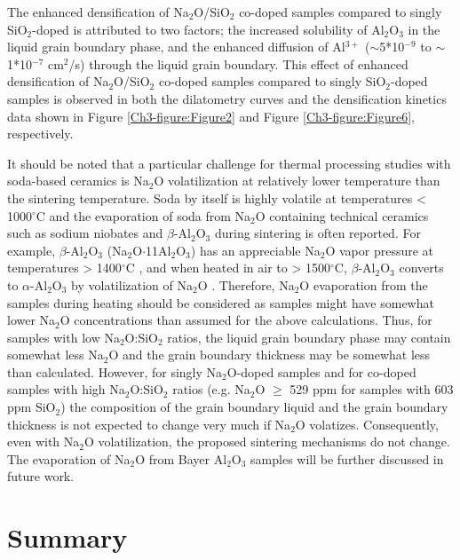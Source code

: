The enhanced densification of Na$_{2}$O/SiO$_{2}$ co-doped samples compared to singly SiO$_{2}$-doped is attributed to two factors; the increased solubility of Al$_{2}$O$_{3}$ in the liquid grain boundary phase, and the enhanced diffusion of Al$^{3+}$ ($\sim$5*10$^{-9}$ to $\sim$1*10$^{-7}$ cm$^{2}$/s) through the liquid grain boundary. This effect of enhanced densification of Na$_{2}$O/SiO$_{2}$ co-doped samples compared to singly SiO$_{2}$-doped samples is observed in both the dilatometry curves and the densification kinetics data shown in Figure \ref{Ch3-figure:Figure2} and Figure \ref{Ch3-figure:Figure6}, respectively. 

It should be noted that a particular challenge for thermal processing studies with soda-based ceramics is Na$_{2}$O volatilization at relatively lower temperature than the sintering temperature. Soda by itself is highly volatile at temperatures < 1000$^{\circ}$C and the evaporation of soda from Na$_{2}$O containing technical ceramics such as sodium niobates \cite{Popovic2012} and $\beta$-Al$_{2}$O$_{3}$ during sintering is often reported. For example, $\beta$-Al$_{2}$O$_{3}$ (Na$_{2}$O$\cdot$11Al$_{2}$O$_{3}$) has an appreciable Na$_{2}$O vapor pressure at temperatures > 1400$^{\circ}$C \cite{Kummer1972}, and when heated in air to > 1500$^{\circ}$C, $\beta$-Al$_{2}$O$_{3}$ converts to $\alpha$-Al$_{2}$O$_{3}$ by volatilization of Na$_{2}$O \cite{Kummer1972,Gallup1935}. Therefore, Na$_{2}$O evaporation from the samples during heating should be considered as samples might have somewhat lower Na$_{2}$O concentrations than assumed for the above calculations. Thus, for samples with low Na$_{2}$O:SiO$_{2}$ ratios, the liquid grain boundary phase may contain somewhat less Na$_{2}$O and the grain boundary thickness may be somewhat less than calculated. However, for singly Na$_{2}$O-doped samples and for co-doped samples with high Na$_{2}$O:SiO$_{2}$ ratios (e.g. Na$_{2}$O $\geq$ 529 ppm for samples with 603 ppm SiO$_{2}$) the composition of the grain boundary liquid and the grain boundary thickness is not expected to change very much if Na$_{2}$O volatizes. Consequently, even with Na$_{2}$O volatilization, the proposed sintering mechanisms do not change. The evaporation of Na$_{2}$O from Bayer Al$_{2}$O$_{3}$ samples will be further discussed in future work.

\section{Summary}

